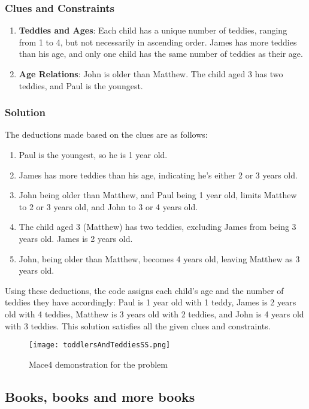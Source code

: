 \documentclass[a4paper,12pt]{report}
\begin{document}
\subsubsection{Clues and Constraints}
\begin{enumerate}
\item  \textbf{Teddies and Ages}: Each child has a unique number of teddies, ranging from 1 to 4, but not necessarily in ascending order. James has more teddies than his age, and only one child has the same number of teddies as their age.
\item \textbf{Age Relations}: John is older than Matthew. The child aged 3 has two teddies, and Paul is the youngest.
\end{enumerate}

\subsubsection{Solution}

The deductions made based on the clues are as follows:
\begin{enumerate}
    \item Paul is the youngest, so he is 1 year old.
    \item James has more teddies than his age, indicating he's either 2 or 3 years old.
    \item John being older than Matthew, and Paul being 1 year old, limits Matthew to 2 or 3 years old, and John to 3 or 4 years old.
    \item The child aged 3 (Matthew) has two teddies, excluding James from being 3 years old. James is 2 years old.
    \item John, being older than Matthew, becomes 4 years old, leaving Matthew as 3 years old.
\end{enumerate}
Using these deductions, the code assigns each child's age and the number of teddies they have accordingly: Paul is 1 year old with 1 teddy, James is 2 years old with 4 teddies, Matthew is 3 years old with 2 teddies, and John is 4 years old with 3 teddies. This solution satisfies all the given clues and constraints.

\begin{figure}[h]
\texttt{[image: toddlersAndTeddiesSS.png]}
\centering
\caption{Mace4 demonstration for the problem}
\end{figure}

\subsection{Books, books and more books}
\end{document}
